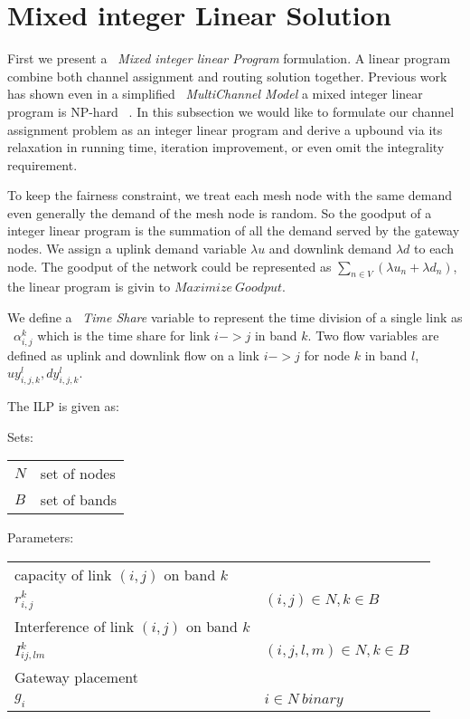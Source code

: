 \section{Mixed integer Linear Solution}
\label{sec:linearopt}

First we present a ~\emph{Mixed integer linear Program} formulation. A linear program combine both channel assignment and routing solution together. 
Previous work has shown even in a simplified ~\emph{MultiChannel Model} a mixed integer linear program is NP-hard ~\cite{marina2010topology}. In this subsection we would like to formulate our channel assignment problem as an integer linear program and derive a upbound via its relaxation 
in running time, iteration improvement, or even omit the integrality requirement.

To keep the fairness constraint, we treat each mesh node with the same demand even generally the demand of the mesh node is random. So the goodput of a integer linear program is the summation of all the demand served by the gateway nodes. We assign a uplink demand variable $\lambda u$ and downlink demand $\lambda d$ to each node. The goodput of the network could be represented as $\sum_{n \in V}(\lambda u_n+ \lambda d_n)$, the linear program is givin to $Maximize\ Goodput$.

We define a ~\emph{Time Share} variable to represent the time division of a single link as ~\emph{$\alpha_{i,j}^k$} which is the time share for link $i->j$ in band $k$. 
Two flow variables are defined as uplink and downlink flow on a link $i->j$ for node $k$ in band $l$, $uy_{i,j,k}^l,dy_{i,j,k}^l$.

\vspace{3pt}
The ILP is given as:

\vspace{2pt}
 Sets:
\vspace{2pt}

\begin{tabular}{ll}
$N$ & set of nodes \\
$B$ & set of bands \\
\end{tabular} 

\vspace{2pt}
Parameters: 
\vspace{1pt}

\begin{tabular}{lll}
capacity of link $(i,j)$ on band $k$ \\
$r_{i,j}^k$ & $(i,j) \in N, k \in B$ & \\
Interference of link $(i,j)$ on band $k$\\
$I_{ij,lm}^k$ & $(i,j,l,m) \in N, k \in B $ & \\
Gateway placement\\
$g_i$ & $i \in N\ binary$ &
\end{tabular}\\


